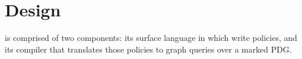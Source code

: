 \section{Design}
\label{sec:design}

\syslang{} is comprised of two components: its surface language in which \ces{} write policies,
and its compiler that translates those policies to graph queries over a marked PDG.



